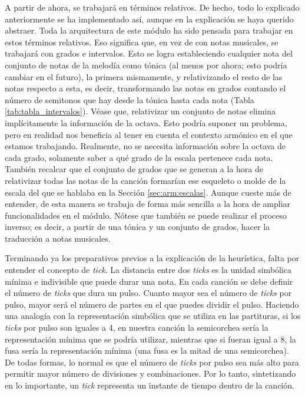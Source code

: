     A partir de ahora, se trabajará en términos relativos. De hecho, todo lo explicado anteriormente se ha implementado así, aunque en la explicación se haya querido abstraer. Toda la arquitectura de este módulo ha sido pensada para trabajar en estos términos relativos. Eso significa que, en vez de con notas musicales, se trabajará con grados e intervalos. Esto se logra estableciendo cualquier nota del conjunto de notas de la melodía como tónica (al menos por ahora; esto podría cambiar en el futuro), la primera mismamente, y relativizando el resto de las notas respecto a esta, es decir, transformando las notas en grados contando el número de semitonos que hay desde la tónica hasta cada nota (Tabla \ref{tab:tabla_intervalos}). Véase que, relativizar un conjunto de notas elimina implícitamente la información de la octava. Esto podría suponer un problema, pero en realidad nos beneficia al tener en cuenta el contexto armónico en el que estamos trabajando. Realmente, no se necesita  información sobre la octava de cada grado, solamente saber a qué grado de la escala pertenece cada nota. También recalcar que el conjunto de grados que se generan a la hora de relativizar todas las notas de la canción formarían ese esqueleto o molde de la escala del que se hablaba en la Sección \ref{sec:arm:escalas}. Aunque cueste más de entender, de esta manera se trabaja de forma más sencilla a la hora de ampliar funcionalidades en el módulo. Nótese que también se puede realizar el proceso inverso; es decir, a partir de una tónica y un conjunto de grados, hacer la traducción a notas musicales.

    Terminando ya los preparativos previos a la explicación de la heurística, falta por entender el concepto de \textit{tick}. La distancia entre dos \textit{ticks} es la unidad simbólica mínima e indivisible que puede durar una nota. En cada canción se debe definir el número de \textit{ticks} que dura un pulso. Cuanto mayor sea el número de \textit{ticks} por pulso, mayor será el número de partes en el que puedes dividir el pulso. Haciendo una analogía con la representación simbólica que se utiliza en las partituras, si los \textit{ticks} por pulso son iguales a 4, en nuestra canción la semicorchea sería la representación mínima que se podría utilizar, mientras que si fueran igual a 8, la fusa sería la representación mínima (una fusa es la mitad de una semicorchea). De todas formas, lo normal es que el número de \textit{ticks} por pulso sea más alto para permitir mayor número de divisiones y combinaciones. Por lo tanto, sintetizando en lo importante, un \textit{tick} representa un instante de tiempo dentro de la canción.

